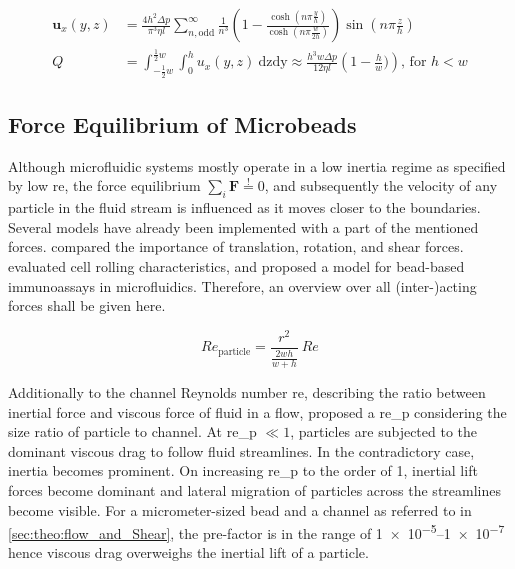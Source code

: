   \begin{align}
\mathbf{u}   _x(y,z) &= \frac{4 h^2 \Delta p}{\pi^3 \eta l} \sum_{n,\text{odd}}^{\infty} \frac{1}{n^3} \left( 1- \frac{\cosh (n \pi \frac{y}{h})}{\cosh (n \pi \frac{w}{2h})} \right) \sin (n \pi \frac{z}{h}) \label{eq:flowVelocityRect} \\
  Q    &= \int_{-\frac{1}{2}w}^{\frac{1}{2}w} \int_{0}^{h} u   _x(y,z) \ \mathrm{dzdy} \approx \frac{h^3 w \Delta p}{12 \eta l} \left( 1 - \frac{h}{w}) \right) \label{eq:flowRateRect} \text{, \ for \ } h < w
\end{align}


\subsection{Force Equilibrium of Microbeads}
\label{sec:theo:force}
Although microfluidic systems mostly operate in a low inertia regime as specified by low \gls{re}, the force equilibrium $\sum_{i} \mathbf{F} \overset{!}{=} 0$, and subsequently the velocity of any particle in the fluid stream is influenced as it moves closer to the boundaries. Several models have already been implemented with a part of the mentioned forces. \citet{lit:fluid:comparison} compared the importance of translation, rotation, and shear forces. \citet{lit:fluidics:RollingCharacteristics} evaluated cell rolling characteristics, and \citet{lit:fluidic:ModelMIT} proposed a model for bead-based immunoassays in microfluidics. Therefore, an overview over all (inter-)acting forces shall be given here.

\begin{equation}
	\mathit{Re}_\text{particle} = \frac{r^2}{\frac{2wh}{w+h}} \ \mathit{Re} 
\end{equation}

Additionally to the channel Reynolds number \gls{re}, describing the ratio between inertial force and viscous force of fluid in a flow, \citet{lit:fluidic:f_wall} proposed a \gls{re_p} considering the size ratio of particle to channel. At \gls{re_p} $\ll 1$, particles are subjected to the dominant viscous drag to follow fluid streamlines. In the contradictory case, inertia becomes prominent. On increasing \gls{re_p} to the order of 1, inertial lift forces become dominant and lateral migration of particles across the streamlines become visible.  For a micrometer-sized bead and a channel as referred to in \cref{sec:theo:flow_and_Shear}, the pre-factor is in the range of \numrange{1e-5}{1e-7} hence viscous drag overweighs the inertial lift of a particle.

